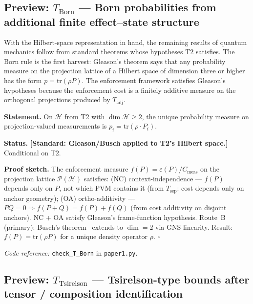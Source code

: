 \documentclass[11pt]{article}
\theoremstyle{remark}
\newcommand{\coderef}[2]{\smallskip\noindent\textit{Code reference:} \texttt{#1} in \texttt{#2}.}
\begin{document}
\subsection{Preview: \texorpdfstring{$T_{\mathrm{Born}}$}{T Born} --- Born probabilities from additional finite effect--state structure}

\noindent With the Hilbert-space representation in hand, the remaining results of quantum mechanics follow from standard theorems whose hypotheses T2 satisfies.  The Born rule is the first harvest: Gleason's theorem says that any probability measure on the projection lattice of a Hilbert space of dimension three or higher has the form $p = \mathrm{tr}(\rho P)$.  The enforcement framework satisfies Gleason's hypotheses because the enforcement cost is a finitely additive measure on the orthogonal projections produced by $T_{\mathrm{adj}}$.

\begin{tcolorbox}[apfbox, title={$T_{\mathrm{Born}}$: Born Rule from Admissibility Invariance}]
\textbf{Statement.}  On $\mathcal{H}$ from T2 with $\dim \mathcal{H} \ge 2$, the unique probability measure on projection-valued measurements is $p_i = \mathrm{tr}(\rho \cdot P_i)$.

\smallskip\noindent\textbf{Status.}  \textbf{[Standard: Gleason/Busch applied to T2's Hilbert space.]}  Conditional on T2.

\smallskip\noindent\textbf{Proof sketch.}  The enforcement measure $f(P) = \varepsilon(P)/C_{\mathrm{meas}}$ on the projection lattice $\mathcal{P}(\mathcal{H})$ satisfies: (NC) context-independence --- $f(P)$ depends only on $P$, not which PVM contains it (from $T_{\mathrm{sep}}$: cost depends only on anchor geometry); (OA) ortho-additivity --- $PQ = 0 \Rightarrow f(P+Q) = f(P) + f(Q)$ (from cost additivity on disjoint anchors).  NC + OA satisfy Gleason's frame-function hypothesis.  Route~B (primary): Busch's theorem~\cite{Busch2003} extends to $\dim = 2$ via GNS linearity.  Result: $f(P) = \mathrm{tr}(\rho P)$ for a unique density operator $\rho$.  \hfill$\square$

\coderef{check\_T\_Born}{paper1.py}
\end{tcolorbox}


\subsection{Preview: \texorpdfstring{$T_{\mathrm{Tsirelson}}$}{T Tsirelson} --- Tsirelson-type bounds after tensor / composition identification}
\label{sec:T_Tsirelson}
\end{document}
